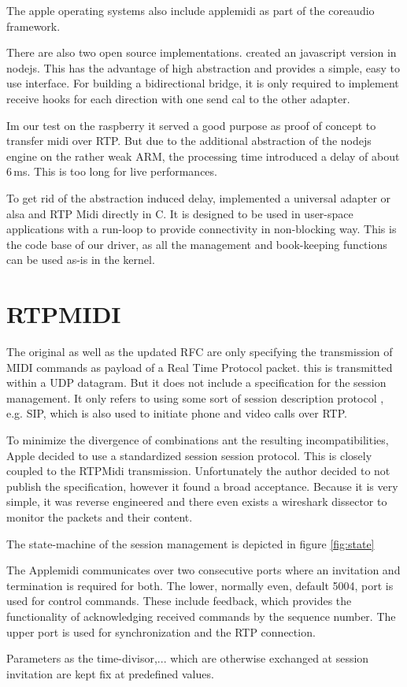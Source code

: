 \documentclass[paper=a4,fontsize=11pt,pagesize,bibtotoc]{scrartcl}
\begin{document}
	The apple operating systems also include applemidi as part of the coreaudio framework.
	
	
	There are also two open source implementations. 
	created an javascript version in nodejs. This has the advantage of high abstraction and provides a simple, easy to use interface. For building a bidirectional bridge, it is only required to implement receive hooks for each direction with one send cal to the other adapter.
	
	Im our test on the raspberry it served a good purpose as proof of concept to transfer midi over RTP. But due to the additional abstraction of the nodejs engine on the rather weak ARM, the processing time introduced a delay of about 6\,ms. This is too long for live performances.
	
	To get rid of the abstraction induced delay, 
	implemented a universal adapter or alsa and RTP Midi directly in C. It is designed to be used in user-space applications with a run-loop to provide connectivity in non-blocking way. This is the code base of our driver, as all the management and book-keeping functions can be used as-is in the kernel.
	
	\section{RTPMIDI}
	The original as well as the updated RFC
	are only specifying the transmission of MIDI commands as payload of a Real Time Protocol packet. this is transmitted within a UDP datagram. But it does not include a specification for the session management. It only refers to using some sort of session description protocol
	, e.g. SIP, which is also used to initiate phone and video calls over RTP.
	
	
	To minimize the divergence of combinations ant the resulting incompatibilities, Apple decided to use a standardized session session protocol. This is closely coupled to the RTPMidi transmission. Unfortunately the author decided to not publish the specification, however it found a broad acceptance. Because it is very simple, it was reverse engineered and there even exists a wireshark dissector to monitor the packets and their content.
	
	The state-machine of the session management is depicted in figure \ref{fig:state}
	
	
	The Applemidi communicates over two consecutive ports where an invitation and termination is required for both. The lower, normally even, default 5004, port is used for control commands. These include feedback, which provides the functionality of acknowledging received commands by the sequence number. The upper port is used for synchronization and the RTP connection.
	
	Parameters as the time-divisor,...
	which are otherwise exchanged at session invitation are kept fix at predefined values.
	
	 
	
	
	
	
	
	
	
\end{document}

